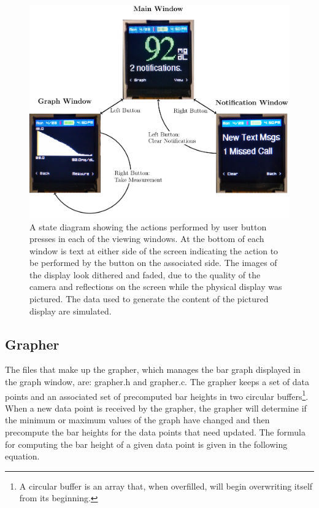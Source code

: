 \begin{figure}[htbp]
    \caption[Display Window State Machine]{
    A state diagram showing the actions performed by user button presses in each of the viewing windows. At the bottom of each window is text at either side of the screen indicating the action to be performed by the button on the associated side. The images of the display look dithered and faded, due to the quality of the camera and reflections on the screen while the physical display was pictured. The data used to generate the content of the pictured display are simulated.
    }
    \begin{center}
    \includegraphics[width=\textwidth,keepaspectratio]{figs/display_window_state_diagram.pdf}
    \end{center}
\label{fig:window_state_machine}
\end{figure}

\subsection{Grapher}
The files that make up the grapher, which manages the bar graph displayed in the graph window, are: grapher.h and grapher.c. The grapher keeps a set of data points and an associated set of precomputed bar heights in two circular buffers\footnote{A circular buffer is an array that, when overfilled, will begin overwriting itself from its beginning.\cite{wikiCB}}. When a new data point is received by the grapher, the grapher will determine if the minimum or maximum values of the graph have changed and then precompute the bar heights for the data points that need updated. The formula for computing the bar height of a given data point is given in the following equation.

